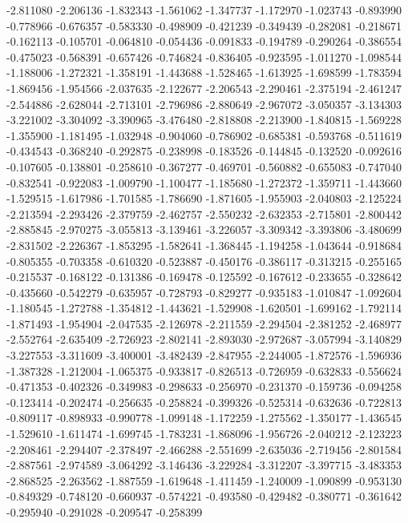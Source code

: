 -2.811080
-2.206136
-1.832343
-1.561062
-1.347737
-1.172970
-1.023743
-0.893990
-0.778966
-0.676357
-0.583330
-0.498909
-0.421239
-0.349439
-0.282081
-0.218671
-0.162113
-0.105701
-0.064810
-0.054436
-0.091833
-0.194789
-0.290264
-0.386554
-0.475023
-0.568391
-0.657426
-0.746824
-0.836405
-0.923595
-1.011270
-1.098544
-1.188006
-1.272321
-1.358191
-1.443688
-1.528465
-1.613925
-1.698599
-1.783594
-1.869456
-1.954566
-2.037635
-2.122677
-2.206543
-2.290461
-2.375194
-2.461247
-2.544886
-2.628044
-2.713101
-2.796986
-2.880649
-2.967072
-3.050357
-3.134303
-3.221002
-3.304092
-3.390965
-3.476480
-2.818808
-2.213900
-1.840815
-1.569228
-1.355900
-1.181495
-1.032948
-0.904060
-0.786902
-0.685381
-0.593768
-0.511619
-0.434543
-0.368240
-0.292875
-0.238998
-0.183526
-0.144845
-0.132520
-0.092616
-0.107605
-0.138801
-0.258610
-0.367277
-0.469701
-0.560882
-0.655083
-0.747040
-0.832541
-0.922083
-1.009790
-1.100477
-1.185680
-1.272372
-1.359711
-1.443660
-1.529515
-1.617986
-1.701585
-1.786690
-1.871605
-1.955903
-2.040803
-2.125224
-2.213594
-2.293426
-2.379759
-2.462757
-2.550232
-2.632353
-2.715801
-2.800442
-2.885845
-2.970275
-3.055813
-3.139461
-3.226057
-3.309342
-3.393806
-3.480699
-2.831502
-2.226367
-1.853295
-1.582641
-1.368445
-1.194258
-1.043644
-0.918684
-0.805355
-0.703358
-0.610320
-0.523887
-0.450176
-0.386117
-0.313215
-0.255165
-0.215537
-0.168122
-0.131386
-0.169478
-0.125592
-0.167612
-0.233655
-0.328642
-0.435660
-0.542279
-0.635957
-0.728793
-0.829277
-0.935183
-1.010847
-1.092604
-1.180545
-1.272788
-1.354812
-1.443621
-1.529908
-1.620501
-1.699162
-1.792114
-1.871493
-1.954904
-2.047535
-2.126978
-2.211559
-2.294504
-2.381252
-2.468977
-2.552764
-2.635409
-2.726923
-2.802141
-2.893030
-2.972687
-3.057994
-3.140829
-3.227553
-3.311609
-3.400001
-3.482439
-2.847955
-2.244005
-1.872576
-1.596936
-1.387328
-1.212004
-1.065375
-0.933817
-0.826513
-0.726959
-0.632833
-0.556624
-0.471353
-0.402326
-0.349983
-0.298633
-0.256970
-0.231370
-0.159736
-0.094258
-0.123414
-0.202474
-0.256635
-0.258824
-0.399326
-0.525314
-0.632636
-0.722813
-0.809117
-0.898933
-0.990778
-1.099148
-1.172259
-1.275562
-1.350177
-1.436545
-1.529610
-1.611474
-1.699745
-1.783231
-1.868096
-1.956726
-2.040212
-2.123223
-2.208461
-2.294407
-2.378497
-2.466288
-2.551699
-2.635036
-2.719456
-2.801584
-2.887561
-2.974589
-3.064292
-3.146436
-3.229284
-3.312207
-3.397715
-3.483353
-2.868525
-2.263562
-1.887559
-1.619648
-1.411459
-1.240009
-1.090899
-0.953130
-0.849329
-0.748120
-0.660937
-0.574221
-0.493580
-0.429482
-0.380771
-0.361642
-0.295940
-0.291028
-0.209547
-0.258399

